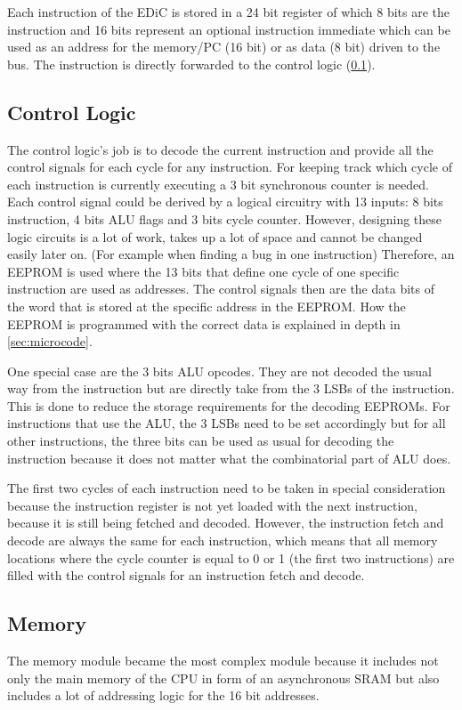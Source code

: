 Each instruction of the \gls{EDiC} is stored in a 24 bit register of which 8 bits are the instruction and 16 bits represent an optional instruction immediate which can be used as an address for the memory/\gls{PC} (16 bit) or as data (8 bit) driven to the bus.
The instruction is directly forwarded to the control logic (\cref{sec:control}).
\subsection{Control Logic}\label{sec:control}
The control logic's job is to decode the current instruction and provide all the control signals for each cycle for any instruction.
For keeping track which cycle of each instruction is currently executing a 3 bit synchronous counter is needed.
Each control signal could be derived by a logical circuitry with 13 inputs: 8 bits instruction, 4 bits \gls{ALU} flags and 3 bits cycle counter.
However, designing these logic circuits is a lot of work, takes up a lot of space and cannot be changed easily later on. (For example when finding a bug in one instruction)
Therefore, an \gls{EEPROM} is used where the 13 bits that define one cycle of one specific instruction are used as addresses.
The control signals then are the data bits of the word that is stored at the specific address in the \gls{EEPROM}.
How the \gls{EEPROM} is programmed with the correct data is explained in depth in \cref{sec:microcode}.

One special case are the 3 bits \gls{ALU} opcodes.
They are not decoded the usual way from the instruction but are directly take from the 3 \glspl{LSB} of the instruction.
This is done to reduce the storage requirements for the decoding \glspl{EEPROM}.
For instructions that use the \gls{ALU}, the 3 \glspl{LSB} need to be set accordingly but for all other instructions, the three bits can be used as usual for decoding the instruction because it does not matter what the combinatorial part of \gls{ALU} does.

The first two cycles of each instruction need to be taken in special consideration because the instruction register is not yet loaded with the next instruction, because it is still being fetched and decoded.
However, the instruction fetch and decode are always the same for each instruction, which means that all memory locations where the cycle counter is equal to 0 or 1 (the first two instructions) are filled with the control signals for an instruction fetch and decode.
\subsection{Memory}\label{sec:memory}
The memory module became the most complex module because it includes not only the main memory of the \gls{CPU} in form of an asynchronous \gls{SRAM} but also includes a lot of addressing logic for the 16 bit addresses.

